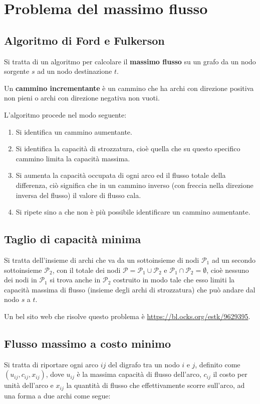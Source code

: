 \documentclass[\main/main.tex]{subfiles}
\begin{document}
\chapter{Problema del massimo flusso}
\section{Algoritmo di Ford e Fulkerson}
Si tratta di un algoritmo per calcolare il \textbf{massimo flusso} su un grafo da un nodo sorgente $s$ ad un nodo destinazione $t$.

\begin{definition}
  Un \textbf{cammino incrementante} è un cammino che ha archi con direzione positiva non pieni o archi con direzione negativa non vuoti.
\end{definition}

L'algoritmo procede nel modo seguente:

\begin{enumerate}
  \item Si identifica un cammino aumentante.
  \item Si identifica la capacità di strozzatura, cioè quella che su questo specifico cammino limita la capacità massima.
  \item Si aumenta la capacità occupata di ogni arco ed il flusso totale della differenza, ciò significa che in un cammino inverso (con freccia nella direzione inversa del flusso) il valore di flusso cala.
  \item Si ripete sino a che non è più possibile identificare un cammino aumentante.
\end{enumerate}

\section{Taglio di capacità minima}
Si tratta dell'insieme di archi che va da un sottoinsieme di nodi $\mathcal{P}_1$ ad un secondo sottoinsieme $\mathcal{P}_2$, con il totale dei nodi $\mathcal{P} = \mathcal{P}_1 \cup \mathcal{P}_2$ e $\mathcal{P}_1 \cap \mathcal{P}_2 = \emptyset$, cioè nessuno dei nodi in $\mathcal{P}_1$ si trova anche in $\mathcal{P}_2$ costruito in modo tale che esso limiti la capacità massima di flusso (insieme degli archi di strozzatura) che può andare dal nodo $s$ a $t$.

Un bel sito web che risolve questo problema è \url{https://bl.ocks.org/estk/9629395}.

\section{Flusso massimo a costo minimo}
Si tratta di riportare ogni arco $ij$ del digrafo tra un nodo $i$ e $j$, definito come $(u_{ij},c_{ij},x_{ij})$, dove $u_{ij}$ è la massima capacità di flusso dell'arco, $c_{ij}$ il costo per unità dell'arco e $x_{ij}$ la quantità di flusso che effettivamente scorre sull'arco, ad una forma a due archi come segue:
\end{document}
